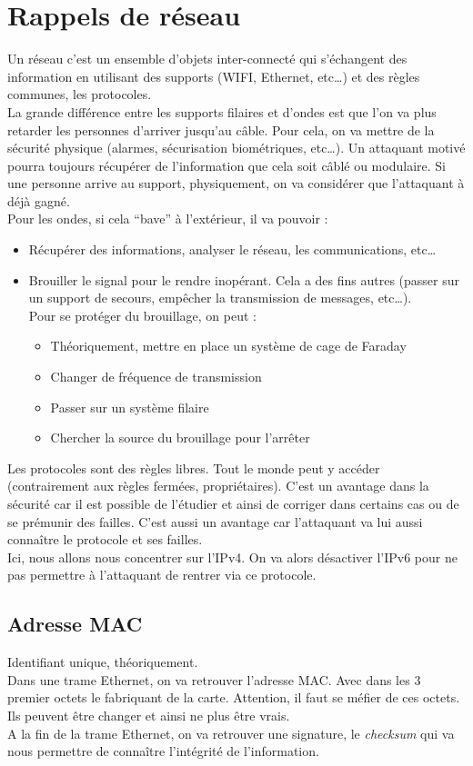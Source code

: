 \section{Rappels de réseau}
Un réseau c'est un ensemble d'objets inter-connecté qui s'échangent des information en utilisant des supports (WIFI, Ethernet, etc\ldots) et des règles communes, les protocoles.\\
La grande différence entre les supports filaires et d'ondes est que l'on va plus retarder les personnes d'arriver jusqu'au câble. Pour cela, on va mettre de la sécurité physique (alarmes, sécurisation biométriques, etc\ldots). Un attaquant motivé pourra toujours récupérer de l'information que cela soit câblé ou modulaire. Si une personne arrive au support, physiquement, on va considérer que l'attaquant à déjà gagné.\\
Pour les ondes, si cela \enquote{bave} à l'extérieur, il va pouvoir :
\begin{itemize}
 \item Récupérer des informations, analyser le réseau, les communications, etc\ldots
 \item Brouiller le signal pour le rendre inopérant. Cela a des fins autres (passer sur un support de secours, empêcher la transmission de messages, etc\ldots).\\Pour se protéger du brouillage, on peut :
 \begin{itemize}
  \item Théoriquement, mettre en place un système de cage de Faraday
  \item Changer de fréquence de transmission
  \item Passer sur un système filaire
  \item Chercher la source du brouillage pour l'arrêter
 \end{itemize}
\end{itemize}
Les protocoles sont des règles libres. Tout le monde peut y accéder (contrairement aux règles fermées, propriétaires). C'est un avantage dans la sécurité car il est possible de l'étudier et ainsi de corriger dans certains cas ou de se prémunir des failles. C'est aussi un avantage car l'attaquant va lui aussi connaître le protocole et ses failles.\\
Ici, nous allons nous concentrer sur l'IPv4. On va alors désactiver l'IPv6 pour ne pas permettre à l'attaquant de rentrer via ce protocole.
\subsection{Adresse MAC}
Identifiant unique, théoriquement.\\
Dans une trame Ethernet, on va retrouver l'adresse MAC. Avec dans les 3 premier octets le fabriquant de la carte. Attention, il faut se méfier de ces octets. Ils peuvent être changer et ainsi ne plus être vrais.\\
A la fin de la trame Ethernet, on va retrouver une signature, le \textit{checksum} qui va nous permettre de connaître l'intégrité de l'information.

